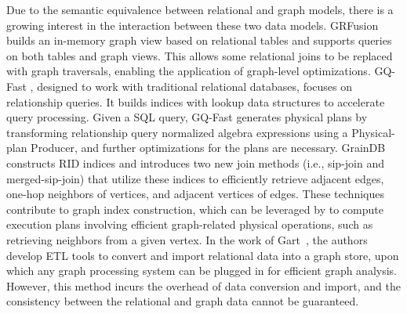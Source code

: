  Due to the semantic equivalence between relational and graph models, there is a growing interest in the interaction between these two data models. GRFusion \cite{GRFusion} builds an in-memory graph view based on relational tables and supports queries on both tables and graph views. This allows some relational joins to be replaced with graph traversals, enabling the application of graph-level optimizations. GQ-Fast \cite{gqfast}, designed to work with traditional relational databases, focuses on relationship queries. It builds indices with lookup data structures to accelerate query processing. Given a SQL query, GQ-Fast generates physical plans by transforming relationship query normalized algebra expressions using a Physical-plan Producer, and further optimizations for the plans are necessary. GrainDB \cite{graindb} constructs RID indices and introduces two new join methods (i.e., sip-join and merged-sip-join) that utilize these indices to efficiently retrieve adjacent edges, one-hop neighbors of vertices, and adjacent vertices of edges. These techniques contribute to graph index construction, which can be leveraged by \relgo to compute execution plans involving efficient graph-related physical operations, such as retrieving neighbors from a given vertex. In the work of Gart~\cite{gart}, the authors develop ETL tools to convert and import relational data into a graph store, upon which any graph processing system can be plugged in for efficient graph analysis. However, this method incurs the overhead of data conversion and import, and the consistency between the relational and graph data cannot be guaranteed.






